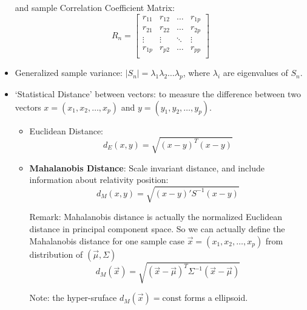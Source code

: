 \begin{itemize}[topsep=6pt,itemsep=4pt]
        and sample Correlation Coefficient Matrix:
        \begin{equation}
            R_n=
            \begin{bmatrix}
            r_{11}&r_{12}&\ldots&r_{1p}\\
            r_{21}&r_{22}&\ldots&r_{2p}\\
            \vdots&\vdots&\ddots&\vdots\\
            r_{1p}&r_{p2}&\ldots&r_{pp}\\
            \end{bmatrix}
        \end{equation}
        \item Generalized sample variance: $ |S_n|=\lambda _1\lambda _2 \ldots \lambda _p$, where $ \lambda_i  $ are eigenvalues of $ S_n $.
        
        \item `Statistical Distance' between vectors: to measure the difference between two vectors $ x=(x_1,x_2,\ldots,x_p) $ and $ y=(y_1,y_2,\ldots,y_p) $.
        \begin{itemize}[topsep=6pt,itemsep=4pt]
            \item Euclidean Distance:
            \begin{equation}
                d_E(x,y) =\sqrt{(x-y)^T(x-y)}
            \end{equation}
            \item \textbf{Mahalanobis Distance}: Scale invariant distance, and include information about relativity position:
            \begin{equation}
                d_M(x,y)=\sqrt{(x-y)'S^{-1}(x-y)} 
            \end{equation}

            
            Remark: Mahalanobis distance is actually the normalized Euclidean distance in principal component space. So we can actually define the Mahalanobis distance for one sample case $ \vec{x}=(x_1,x_2,\ldots ,x_p) $ from distribution of $ (\vec{\mu},\Sigma)  $
            \begin{equation}\label{MahalanobisDistance}
                d_M(\vec{x})=\sqrt{(\vec{x}-\vec{\mu})^T\Sigma ^{-1}(\vec{x}-\vec{\mu})} 
            \end{equation}

            Note: the hyper-sruface $ d_M(\vec{x})=\mathrm{const} $ forms a ellipsoid.

        \end{itemize}
    \end{itemize}

